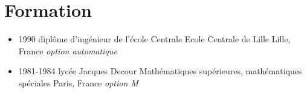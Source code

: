 \section{Formation}




\begin{itemize}

\item{\cventry
{1990}
{diplôme d'ingénieur de l'école Centrale }
{Ecole Centrale de Lille}
{Lille, France}
{\textit{option automatique}}
{}
}

\item{\cventry
{1981-1984}
{lycée Jacques Decour}
{Mathématiques supérieures, mathématiques spéciales}
{Paris, France}
{\textit{option M}}
{}
}




\end{itemize}

\vspace{2pt}

